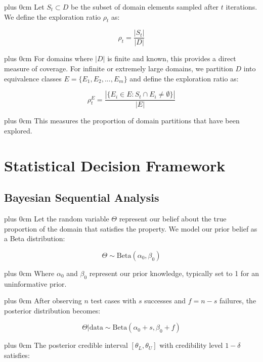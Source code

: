 \documentclass[11pt,a4paper]{article}
\newcommand{\justifytext}{\leftskip=0pt \rightskip=0pt plus 0cm}
\begin{document}
\justifytext
Let $S_t \subset D$ be the subset of domain elements sampled after $t$ iterations. We define the exploration ratio $\rho_t$ as:

\begin{equation}
\rho_t = \frac{|S_t|}{|D|}
\end{equation}

\justifytext
For domains where $|D|$ is finite and known, this provides a direct measure of coverage. For infinite or extremely large domains, we partition $D$ into equivalence classes $E = \{E_1, E_2, ..., E_m\}$ and define the exploration ratio as:

\begin{equation}
\rho_t^E = \frac{|\{E_i \in E : S_t \cap E_i \neq \emptyset\}|}{|E|}
\end{equation}

\justifytext
This measures the proportion of domain partitions that have been explored.

\section{Statistical Decision Framework}

\subsection{Bayesian Sequential Analysis}

\justifytext
Let the random variable $\Theta$ represent our belief about the true proportion of the domain that satisfies the property. We model our prior belief as a Beta distribution:

\begin{equation}
\Theta \sim \text{Beta}(\alpha_0, \beta_0)
\end{equation}

\justifytext
Where $\alpha_0$ and $\beta_0$ represent our prior knowledge, typically set to 1 for an uninformative prior.

\justifytext
After observing $n$ test cases with $s$ successes and $f = n - s$ failures, the posterior distribution becomes:

\begin{equation}
\Theta | \text{data} \sim \text{Beta}(\alpha_0 + s, \beta_0 + f)
\end{equation}

\justifytext
The posterior credible interval $[\theta_L, \theta_U]$ with credibility level $1-\delta$ satisfies:
\end{document}
